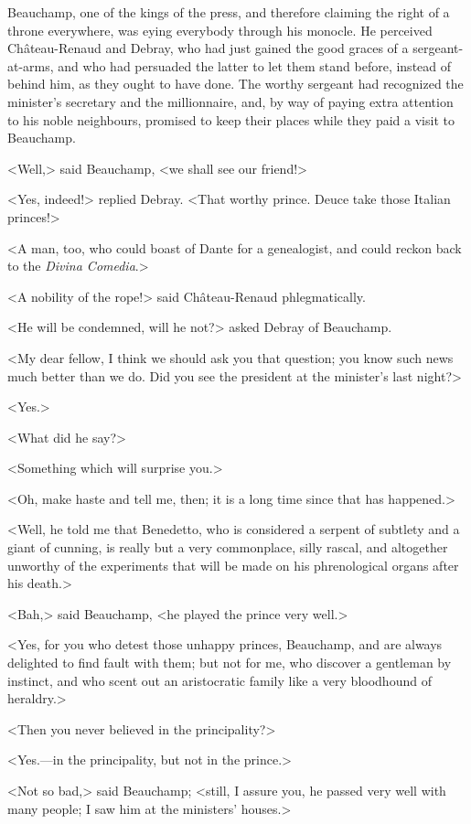  Beauchamp, one of the kings of the press, and therefore claiming the right of a throne everywhere, was eying everybody through his monocle. He perceived Château-Renaud and Debray, who had just gained the good graces of a sergeant-at-arms, and who had persuaded the latter to let them stand before, instead of behind him, as they ought to have done. The worthy sergeant had recognized the minister's secretary and the millionnaire, and, by way of paying extra attention to his noble neighbours, promised to keep their places while they paid a visit to Beauchamp. 

 <Well,> said Beauchamp, <we shall see our friend!> 

 <Yes, indeed!> replied Debray. <That worthy prince. Deuce take those Italian princes!> 

 <A man, too, who could boast of Dante for a genealogist, and could reckon back to the \textit{Divina Comedia}.> 

 <A nobility of the rope!> said Château-Renaud phlegmatically. 

 <He will be condemned, will he not?> asked Debray of Beauchamp. 

 <My dear fellow, I think we should ask you that question; you know such news much better than we do. Did you see the president at the minister's last night?> 

 <Yes.> 

 <What did he say?> 

 <Something which will surprise you.> 

 <Oh, make haste and tell me, then; it is a long time since that has happened.> 

 <Well, he told me that Benedetto, who is considered a serpent of subtlety and a giant of cunning, is really but a very commonplace, silly rascal, and altogether unworthy of the experiments that will be made on his phrenological organs after his death.> 

 <Bah,> said Beauchamp, <he played the prince very well.> 

 <Yes, for you who detest those unhappy princes, Beauchamp, and are always delighted to find fault with them; but not for me, who discover a gentleman by instinct, and who scent out an aristocratic family like a very bloodhound of heraldry.> 

 <Then you never believed in the principality?> 

 <Yes.—in the principality, but not in the prince.> 

 <Not so bad,> said Beauchamp; <still, I assure you, he passed very well with many people; I saw him at the ministers' houses.> 

